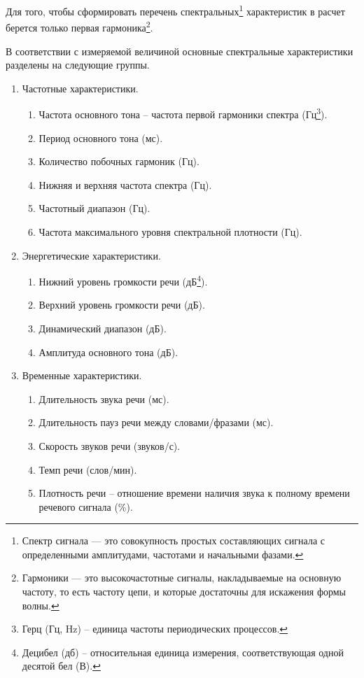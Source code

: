 Для того, чтобы сформировать перечень спектральных\footnote{Спектр сигнала — это совокупность простых составляющих сигнала с определенными амплитудами, частотами и начальными фазами.\cite{spektr}} характеристик в расчет берется только первая гармоника\footnote{Гармоники — это высокочастотные сигналы, накладываемые на основную частоту, то есть частоту цепи, и которые достаточны для искажения формы волны.\cite{spektr}}. 

В соответствии с измеряемой величиной основные спектральные характеристики разделены на следующие группы. \cite{chastot} \cite{chastot2} \cite{signal}
\begin{enumerate}
	\item Частотные характеристики.
	\begin{enumerate}
		\item Частота основного тона -- частота первой гармоники спектра (Гц\footnote{Герц (Гц, Hz) -- единица частоты периодических процессов.}).
		\item Период основного тона (мс).
		\item Количество побочных гармоник (Гц).
		\item Нижняя и верхняя частота спектра (Гц).
		\item Частотный диапазон (Гц).
		\item Частота максимального уровня спектральной плотности (Гц).
	\end{enumerate}
	\item Энергетические характеристики.
	\begin{enumerate}
		\item Нижний уровень громкости речи (дБ\footnote{Децибел (дб) --  относительная единица измерения, соответствующая одной десятой бел (В).}).
		\item Верхний уровень громкости речи (дБ).
		\item Динамический диапазон (дБ).
		\item Амплитуда основного тона (дБ).
	\end{enumerate}
	\item Временные характеристики.
	\begin{enumerate}
		\item Длительность звука речи (мс).
		\item Длительность пауз речи между словами/фразами (мс).
		\item Скорость звуков речи (звуков/с).
		\item Темп речи (слов/мин).
		\item Плотность речи -- отношение времени наличия звука к
		полному времени речевого сигнала (\%).
	\end{enumerate}
\end{enumerate}

